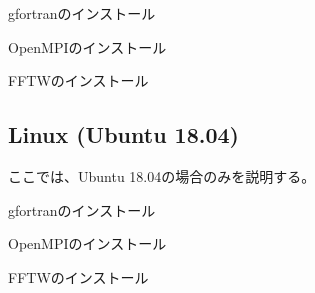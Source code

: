 \documentclass[letterpaper,10pt,dvipdfmx,report]{sphinxmanual}
\begin{document}
\sphinxAtStartPar
gfortranのインストール

\begin{sphinxVerbatim}[commandchars=\\\{\}]
  
\end{sphinxVerbatim}

\sphinxAtStartPar
OpenMPIのインストール

\begin{sphinxVerbatim}[commandchars=\\\{\}]
  
\end{sphinxVerbatim}

\sphinxAtStartPar
FFTWのインストール

\begin{sphinxVerbatim}[commandchars=\\\{\}]
  
\end{sphinxVerbatim}


\subsection{Linux (Ubuntu 18.04)}
\label{\detokenize{environment:linux-ubuntu-18-04}}
\sphinxAtStartPar
ここでは、Ubuntu 18.04の場合のみを説明する。

\sphinxAtStartPar
gfortranのインストール

\begin{sphinxVerbatim}[commandchars=\\\{\}]
   
\end{sphinxVerbatim}

\sphinxAtStartPar
OpenMPIのインストール

\begin{sphinxVerbatim}[commandchars=\\\{\}]
     
\end{sphinxVerbatim}

\sphinxAtStartPar
FFTWのインストール

\begin{sphinxVerbatim}[commandchars=\\\{\}]
   
\end{sphinxVerbatim}
\end{document}
